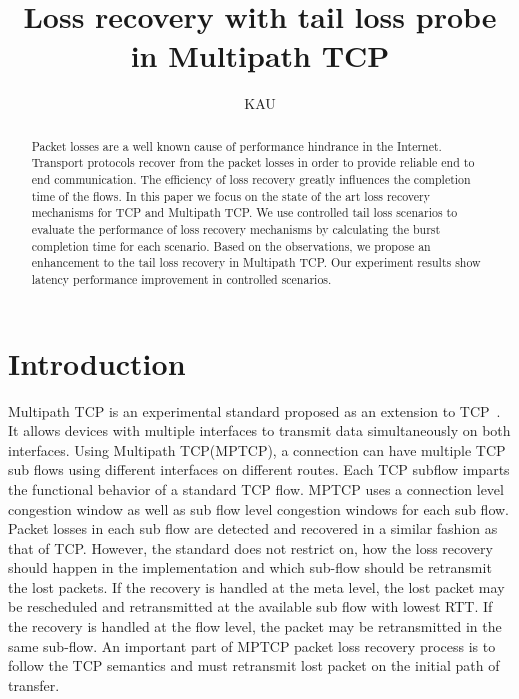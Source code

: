 \documentclass[10pt,draftcls,twocolumn]{IEEEconf}
\title{Loss recovery with tail loss probe in Multipath TCP}
\author{KAU}
\begin{document}
\maketitle

\begin{abstract}
Packet losses are a well known cause of performance hindrance in the Internet. Transport protocols recover from the packet losses in order to provide reliable end to end communication. The efficiency
of loss recovery greatly influences the completion time of the flows. In this paper we focus on the state of the art loss recovery mechanisms for TCP and Multipath TCP. We use controlled tail loss scenarios
to evaluate the performance of loss recovery mechanisms by calculating the burst completion time for each scenario. Based on the observations, we propose an enhancement to the tail loss recovery in Multipath TCP. Our experiment results show latency performance improvement in controlled scenarios. 
\end{abstract}

\section{Introduction}


Multipath TCP is an experimental standard proposed as an extension to TCP~\cite{rfc6824}. It allows devices with multiple interfaces to transmit data simultaneously on both interfaces.  
Using Multipath TCP(MPTCP), a connection can have multiple TCP sub flows using different interfaces on different routes. Each TCP subflow imparts the functional behavior of a standard TCP flow. 
MPTCP uses a connection level congestion window as well as sub flow level congestion windows for each sub flow. Packet losses in each sub flow are detected and recovered in a similar fashion as that of TCP. However, the standard does not restrict on, how the loss recovery should happen in the implementation and which sub-flow should be retransmit the lost packets. If the recovery is handled at the meta level, the lost packet may be rescheduled and retransmitted at the available sub flow with lowest RTT. If the recovery is handled at the flow level, the packet may be retransmitted in the same sub-flow. An important part of MPTCP packet loss recovery process is to follow the TCP semantics and must retransmit lost packet on the initial path of transfer. 
\end{document}
